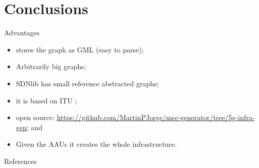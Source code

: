 \documentclass{beamer}
\begin{document}
\section{Conclusions}
\begin{frame}{Advantages}
    \begin{itemize}
        \item stores the graph as GML (easy to parse);
        \item Arbitrarily big graphs;
        \item SDNlib has small reference abstracted graphs;
        \item it is based on ITU \cite{itu};
        \item open source: \url{https://github.com/MartinPJorge/mec-generator/tree/5g-infra-gen}; and
        \item Given the AAUs it creates the whole infrastructure.
    \end{itemize}
\end{frame}


\begin{frame}{References}
    
    
\end{frame}
\end{document}
